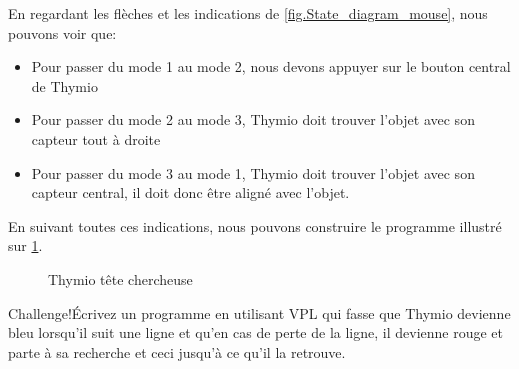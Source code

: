 En regardant les flèches et les indications de \cref{fig.State_diagram_mouse}, nous pouvons voir que:

\begin{itemize}
	\item Pour passer du mode 1 au mode 2, nous devons appuyer sur le bouton central de Thymio
	\item Pour passer du mode 2 au mode 3, Thymio doit trouver l'objet avec son capteur tout à droite
	\item Pour passer du mode 3 au mode 1, Thymio doit trouver l'objet avec son capteur central, il doit donc être aligné avec l'objet.
\end{itemize}

En suivant toutes ces indications, nous pouvons construire le programme illustré sur \cref{fig.prog_tete_chercheuse}.

\begin{figure}[h]
    \centering
    \hspace{1cm}
    \caption{Thymio tête chercheuse}
    \label{fig.prog_tete_chercheuse}
\end{figure}

\begin{bclogo}[couleur = pink!30, arrondi = 0.1, logo = \bccrayon, ombre = true]{Challenge!}Écrivez un programme en utilisant VPL qui fasse que Thymio devienne bleu lorsqu'il suit une ligne et qu'en cas de perte de la ligne, il devienne rouge et parte à sa recherche et ceci jusqu'à ce qu'il la retrouve.
\end{bclogo}